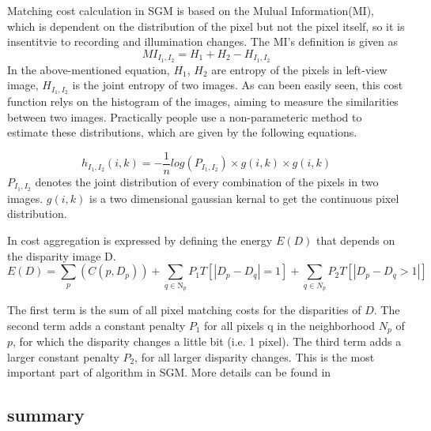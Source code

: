 Matching cost calculation in SGM is based on the Mulual Information(MI), which is dependent on the distribution of the pixel but not the pixel itself, so it is insentitvie to recording and illumination changes. The MI's definition is given as
\begin{equation}
    MI_{I_1, I_2} = H_1 + H_2 - H_{I_1, I_2}
\end{equation}
In the above-mentioned equation, $H_1$, $H_2$ are entropy of the pixels in left-view image, $H_{I_1, I_2}$ is the joint entropy of two images. As can been easily seen, this cost function relys on the histogram of the images, aiming to measure the similarities between two images. Practically people use a non-parameteric method to estimate these distributions, which are given by the following equations.

\begin{equation}
    h_{I_1, I_2}(i, k) = -\frac{1}{n}log(P_{I_1, I_2})\times g(i, k) \times g(i, k)
\end{equation}
$P_{I_1, I_2}$ denotes the joint distribution of every combination of the pixels in two images. $g(i, k)$ is a two dimensional gaussian kernal to get the continuous pixel distribution. 

In cost aggregation is expressed by defining the energy $E(D)$ that depends on the disparity image D.
\begin{equation}
    E(D) = \sum_p(C(p, D_p))+\sum_{q\in \mathrm{N}_{p}}P_1T[|D_p-D_q|=1]+\sum_{q\in N_p}P_2T[|D_p-D_q>1|]
\end{equation}

The first term is the sum of all pixel matching costs for the disparities of $D$. The second term adds a constant penalty $P_1$ for all pixels q in the neighborhood $N_p$ of $p$, for which the disparity changes a little bit (i.e. 1 pixel). The third term adds a larger constant penalty $P_2$, for all larger disparity changes. This is the most important part of algorithm in SGM. More details can be found in \cite{hirschmuller2007stereo}
\subsection{summary}


